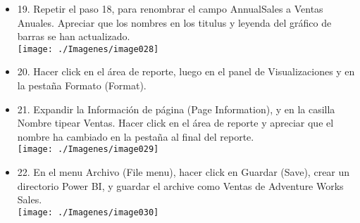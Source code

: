 \begin{itemize}
\item 19. Repetir el paso 18, para renombrar el campo AnnualSales a Ventas Anuales. Apreciar que los nombres en los titulus y leyenda del gráfico de barras se han actualizado. \\

\texttt{[image: ./Imagenes/image028]}

\item 20. Hacer click en el área de reporte, luego en el panel de Visualizaciones y en la pestaña Formato (Format). \\
\item 21. Expandir la Información de página (Page Information), y en la casilla Nombre tipear Ventas. Hacer click en el área de reporte y apreciar que el nombre ha cambiado en la pestaña al final del reporte. \\

\texttt{[image: ./Imagenes/image029]}

\item 22. En el menu Archivo (File menu), hacer click en Guardar (Save), crear un directorio Power BI, y guardar el archive como Ventas de Adventure Works Sales. \\

\texttt{[image: ./Imagenes/image030]}



\end{itemize}